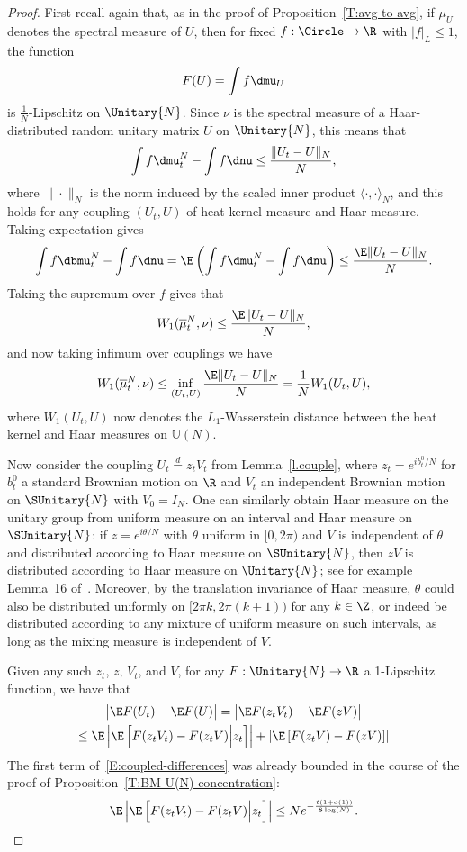 \begin{proof}
First recall again that, as in the proof of Proposition~\ref{T:avg-to-avg}, if $\mu_U$ denotes the spectral measure of $U$, then for fixed $f:\Circle\to\R$ with $|f|_L\le 1$, the function
\[
F(U)=\int f\dmu_U
\]
is $\frac{1}{N}$-Lipschitz on $\Unitary{N}$. Since $\nu$ is the spectral measure of a Haar-distributed random unitary matrix $U$ on $\Unitary{N}$, this means that
\[
\int f\dmu^N_t-\int f\dnu\le\frac{\|U_t-U\|_{N}}{N},
\]
where $\|\cdot\|_N$ is the norm induced by the scaled inner product $\langle\cdot,\cdot\rangle_N$, and this holds for any coupling $(U_t,U)$ of heat kernel measure and Haar measure. Taking expectation gives
\[
\int f\dbmu^N_t-\int f\dnu=\E\left(\int f\dmu^N_t-\int f\dnu\right)\le\frac{\E \|U_t-U\|_{N}}{N}.
\]
Taking the supremum over $f$ gives that
\[
W_1(\overline{\mu}^N_t,\nu)\le\frac{\E\|U_t-U\|_{N}}{N},
\]
and now taking infimum over couplings we have
\begin{equation}\label{eB}
W_1(\overline{\mu}^N_t,\nu)\le\inf_{(U_t,U)}\frac{\E\|U_t-U\|_{N}}{N}=\frac{1}{N}W_1(U_t,U),
\end{equation}
where $W_1(U_t,U)$ now denotes the $L_1$-Wasserstein distance between the heat kernel and Haar measures on $\mathbb{U}(N)$.

Now consider the coupling $U_t\overset{d}{=}z_tV_t$ from Lemma~\ref{l.couple}, where $z_t=e^{ib_t^0/N}$ for $b^0_t$ a standard Brownian motion on $\R$ and $V_t$ an independent Brownian motion on $\SUnitary{N}$ with $V_0=I_N$. One can similarly obtain Haar measure on the unitary group from uniform measure on an interval and Haar measure on $\SUnitary{N}$: if $z=e^{i\theta/N}$ with $\theta$ uniform in $[0,2\pi)$ and $V$ is independent of $\theta$ and distributed according to Haar measure on $\SUnitary{N}$, then $zV$ is distributed according to Haar measure on $\Unitary{N}$; see for example Lemma~16 of~\cite{MM-ECP-2013}. Moreover, by the translation invariance of Haar measure, $\theta$ could also be distributed uniformly on $[2\pi k,2\pi(k+1))$ for any $k\in\Z$, or indeed be distributed according to any mixture of uniform measure on such intervals, as long as the mixing measure is independent of $V$.

Given any such $z_t$, $z$, $V_t$, and $V$, for any $F:\Unitary{N}\to\R$ a 1-Lipschitz function, we have that
\begin{multline}\label{E:coupled-differences}
\big|\E F(U_t)-\E F(U)\big|=\big|\E F(z_tV_t)-\E F(zV)\big|\\
\le\E\left|\E\left[F(z_tV_t)-F(z_tV)\Big|z_t\right]\right|+\left|\E\left[F(z_tV)-F(zV)\right]\right|
\end{multline}
The first term of~\eqref{E:coupled-differences} was already bounded in the course of the proof of Proposition~\ref{T:BM-U(N)-concentration}:
\begin{equation}\label{e.done}
\E\left|\E\left[F(z_tV_t)-F(z_tV)\Big|z_t\right]\right|\le Ne^{-\frac{t(1+o(1))}{8\log(N)}}.
\end{equation}


\end{proof}
